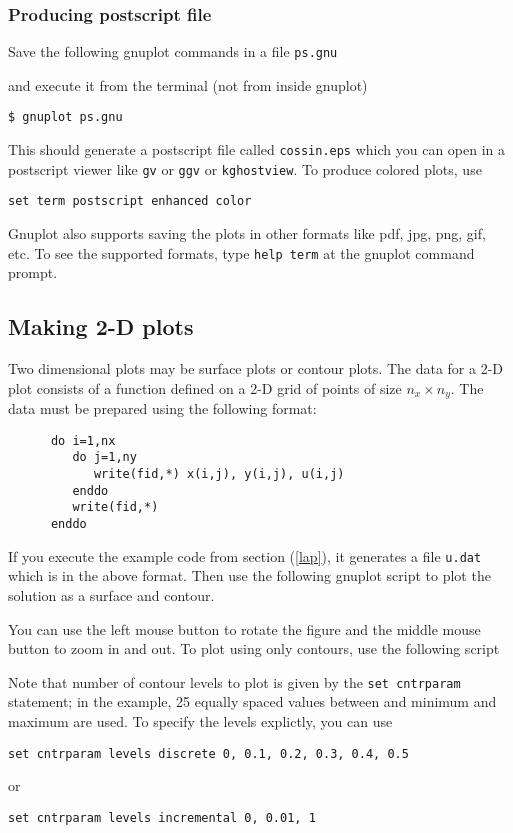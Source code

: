 \documentclass[11pt,oneside]{amsart}
\begin{document}
\subsubsection{Producing postscript file}
Save the following gnuplot commands in a file {\tt ps.gnu}

and execute it from the terminal (not from inside gnuplot)
\begin{verbatim}
$ gnuplot ps.gnu
\end{verbatim}
This should generate a postscript file called {\tt cossin.eps} which you can open in a postscript viewer like {\tt gv} or {\tt ggv} or {\tt kghostview}. To produce colored plots, use
\begin{verbatim}
set term postscript enhanced color
\end{verbatim}
Gnuplot also supports saving the plots in other formats like pdf, jpg, png, gif, etc. To see the supported formats, type {\tt help term} at the gnuplot command prompt.

\subsection{Making 2-D plots}
Two dimensional plots may be surface plots or contour plots. The data for a 2-D plot consists of a function defined on a 2-D grid of points of size $n_x \times n_y$. The data must be prepared using the following format:
\begin{verbatim}
      do i=1,nx
         do j=1,ny
            write(fid,*) x(i,j), y(i,j), u(i,j)
         enddo
         write(fid,*)
      enddo
\end{verbatim}
If you execute the example code from section (\ref{lap}), it generates a file {\tt u.dat} which is in the above format. Then use the following gnuplot script to plot the solution as a surface and contour.

You can use the left mouse button to rotate the figure and the middle mouse button to zoom in and out. To plot using only contours, use the following script

Note that number of contour levels to plot is given by the {\tt set cntrparam} statement; in the example, 25 equally spaced values between and minimum and maximum are used. To specify the levels explictly, you can use
\begin{verbatim}
set cntrparam levels discrete 0, 0.1, 0.2, 0.3, 0.4, 0.5
\end{verbatim}
or
\begin{verbatim}
set cntrparam levels incremental 0, 0.01, 1
\end{verbatim}
\end{document}
